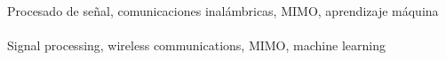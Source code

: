 ﻿\vspace{8cm}
\thispagestyle{empty}

\\[0.6cm]
\noindent Procesado de señal, comunicaciones inalámbricas, MIMO, aprendizaje máquina\\[2cm]

\\[0.6cm]
\noindent Signal processing, wireless communications, MIMO, machine learning  \clearpage
